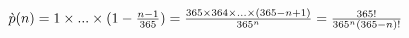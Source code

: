 \documentclass[10pt]{article}
\begin{document}
$\grave{p}(n) = 1 \times ... \times (1-\frac{n-1}{365}) \\= \frac{365 \times 364 \times...\times (365-n+1)}{365^n} \\= \frac{365!}{365^n(365-n)!}
$
\end{document}
